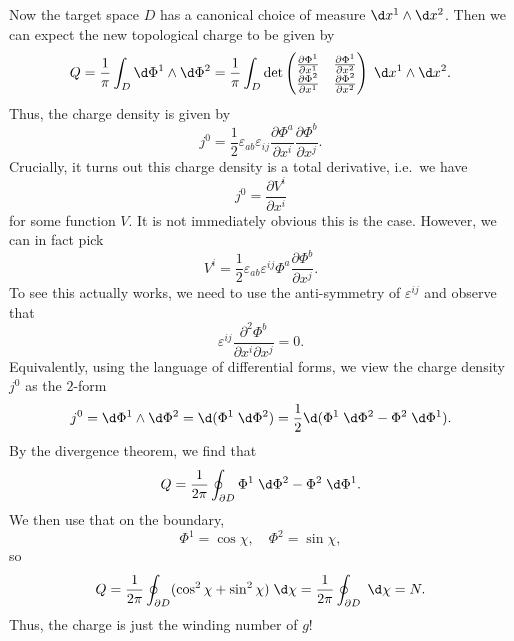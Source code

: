 \documentclass[a4paper]{article}
\begin{document}
Now the target space $D$ has a canonical choice of measure $\d x^1 \wedge \d x^2$. Then we can expect the new topological charge to be given by
\[
  Q = \frac{1}{\pi} \int_D \d \Phi^1 \wedge \d \Phi^2 = \frac{1}{\pi} \int_D \det
  \begin{pmatrix}
    \frac{\partial \Phi^1}{\partial x^1} & \frac{\partial \Phi^1}{\partial x^2}\\
    \frac{\partial \Phi^2}{\partial x^1} & \frac{\partial \Phi^2}{\partial x^2}
  \end{pmatrix}\;\d x^1 \wedge \d x^2.
\]
Thus, the charge density is given by
\[
  j^0 = \frac{1}{2} \varepsilon_{ab} \varepsilon_{ij} \frac{\partial \Phi^a}{\partial x^i} \frac{\partial \Phi^b}{\partial x^j}.
\]
Crucially, it turns out this charge density is a total derivative, i.e.\ we have
\[
  j^0 = \frac{\partial V^i}{\partial x^i}
\]
for some function $V$. It is not immediately obvious this is the case. However, we can in fact pick
\[
  V^i = \frac{1}{2} \varepsilon_{ab}\varepsilon^{ij} \Phi^a \frac{\partial \Phi^b}{\partial x^j}.
\]
To see this actually works, we need to use the anti-symmetry of $\varepsilon^{ij}$ and observe that
\[
  \varepsilon^{ij} \frac{\partial^2 \Phi^b}{\partial x^i \partial x^j} = 0.
\]
Equivalently, using the language of differential forms, we view the charge density $j^0$ as the $2$-form
\[
  j^0 = \d \Phi^1 \wedge \d \Phi^2 = \d (\Phi^1\;\d \Phi^2) = \frac{1}{2} \d (\Phi^1 \;\d \Phi^2 - \Phi^2 \;\d \Phi^1).
\]
By the divergence theorem, we find that
\[
  Q = \frac{1}{2\pi}\oint_{\partial D} \Phi^1 \;\d \Phi^2 - \Phi^2 \;\d \Phi^1.
\]
We then use that on the boundary,
\[
  \Phi^1 = \cos \chi,\quad \Phi^2 = \sin \chi,
\]
so
\[
  Q = \frac{1}{2\pi} \oint_{\partial D} (\cos^2 \chi + \sin^2 \chi) \;\d \chi = \frac{1}{2\pi} \oint_{\partial D} \;\d \chi = N.
\]
Thus, the charge is just the winding number of $g$!
\end{document}

